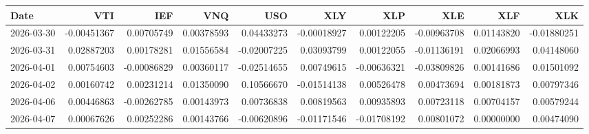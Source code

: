 \begin{tabular}{lrrrrrrrrr}
\toprule
Date & VTI & IEF & VNQ & USO & XLY & XLP & XLE & XLF & XLK \\
\midrule
2026-03-30 & -0.00451367 & 0.00705749 & 0.00378593 & 0.04433273 & -0.00018927 & 0.00122205 & -0.00963708 & 0.01143820 & -0.01880251 \\
2026-03-31 & 0.02887203 & 0.00178281 & 0.01556584 & -0.02007225 & 0.03093799 & 0.00122055 & -0.01136191 & 0.02066993 & 0.04148060 \\
2026-04-01 & 0.00754603 & -0.00086829 & 0.00360117 & -0.02514655 & 0.00749615 & -0.00636321 & -0.03809826 & 0.00141686 & 0.01501092 \\
2026-04-02 & 0.00160742 & 0.00231214 & 0.01350090 & 0.10566670 & -0.01514138 & 0.00526478 & 0.00473694 & 0.00181873 & 0.00797346 \\
2026-04-06 & 0.00446863 & -0.00262785 & 0.00143973 & 0.00736838 & 0.00819563 & 0.00935893 & 0.00723118 & 0.00704157 & 0.00579244 \\
2026-04-07 & 0.00067626 & 0.00252286 & 0.00143766 & -0.00620896 & -0.01171546 & -0.01708192 & 0.00801072 & 0.00000000 & 0.00474090 \\
\bottomrule
\end{tabular}

